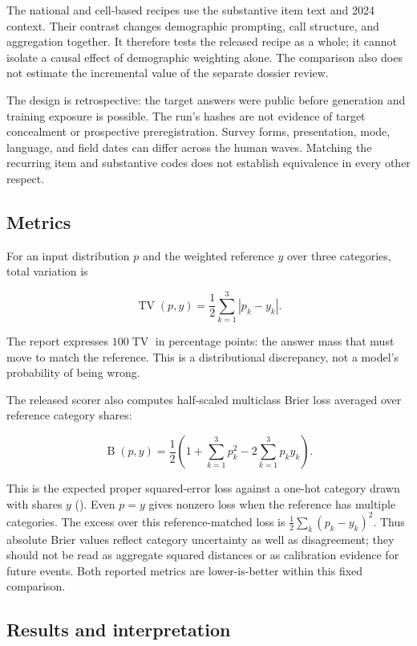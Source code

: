 \documentclass[
  11pt,
]{article}
\begin{document}
The national and cell-based recipes use the substantive item text and
2024 context. Their contrast changes demographic prompting, call
structure, and aggregation together. It therefore tests the released
recipe as a whole; it cannot isolate a causal effect of demographic
weighting alone. The comparison also does not estimate the incremental
value of the separate dossier review.

The design is retrospective: the target answers were public before
generation and training exposure is possible. The run's hashes are not
evidence of target concealment or prospective preregistration. Survey
forms, presentation, mode, language, and field dates can differ across
the human waves. Matching the recurring item and substantive codes does
not establish equivalence in every other respect.

\subsection{Metrics}\label{metrics}

For an input distribution \(p\) and the weighted reference \(y\) over
three categories, total variation is

\[
\operatorname{TV}(p,y)=\frac{1}{2}\sum_{k=1}^{3}|p_k-y_k|.
\]

The report expresses \(100\operatorname{TV}\) in percentage points: the
answer mass that must move to match the reference. This is a
distributional discrepancy, not a model's probability of being wrong.

The released scorer also computes half-scaled multiclass Brier loss
averaged over reference category shares:

\[
\operatorname{B}(p,y)=\frac{1}{2}\left(1+\sum_{k=1}^{3}p_k^2-2\sum_{k=1}^{3}p_k y_k\right).
\]

This is the expected proper squared-error loss against a one-hot
category drawn with shares \(y\) ().
Even \(p=y\) gives nonzero loss when the reference has multiple
categories. The excess over this reference-matched loss is
\(\frac{1}{2}\sum_k(p_k-y_k)^2\). Thus absolute Brier values reflect
category uncertainty as well as disagreement; they should not be read as
aggregate squared distances or as calibration evidence for future
events. Both reported metrics are lower-is-better within this fixed
comparison.

\subsection{Results and
interpretation}\label{results-and-interpretation}
\end{document}
